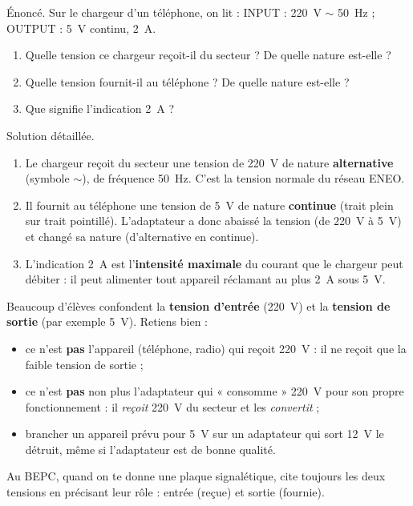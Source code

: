 \documentclass[11pt]{article}
\begin{document}
\begin{exoresolu}
Énoncé. Sur le chargeur d'un téléphone, on lit : INPUT : \SI{220}{V} $\sim$ \SI{50}{Hz} ; OUTPUT : \SI{5}{V} continu, \SI{2}{A}.
\begin{enumerate}
\item Quelle tension ce chargeur reçoit-il du secteur ? De quelle nature est-elle ?
\item Quelle tension fournit-il au téléphone ? De quelle nature est-elle ?
\item Que signifie l'indication \SI{2}{A} ?
\end{enumerate}
\tcblower
Solution détaillée.
\begin{enumerate}
\item Le chargeur reçoit du secteur une tension de \SI{220}{V} de nature \textbf{alternative} (symbole $\sim$), de fréquence \SI{50}{Hz}. C'est la tension normale du réseau ENEO.
\item Il fournit au téléphone une tension de \SI{5}{V} de nature \textbf{continue} (trait plein sur trait pointillé). L'adaptateur a donc abaissé la tension (de \SI{220}{V} à \SI{5}{V}) et changé sa nature (d'alternative en continue).
\item L'indication \SI{2}{A} est l'\textbf{intensité maximale} du courant que le chargeur peut débiter : il peut alimenter tout appareil réclamant au plus \SI{2}{A} sous \SI{5}{V}.
\end{enumerate}
\end{exoresolu}

\begin{attention}
Beaucoup d'élèves confondent la \textbf{tension d'entrée} (\SI{220}{V}) et la \textbf{tension de sortie} (par exemple \SI{5}{V}). Retiens bien :
\begin{itemize}
\item ce n'est \textbf{pas} l'appareil (téléphone, radio) qui reçoit \SI{220}{V} : il ne reçoit que la faible tension de sortie ;
\item ce n'est \textbf{pas} non plus l'adaptateur qui « consomme » \SI{220}{V} pour son propre fonctionnement : il \emph{reçoit} \SI{220}{V} du secteur et les \emph{convertit} ;
\item brancher un appareil prévu pour \SI{5}{V} sur un adaptateur qui sort \SI{12}{V} le détruit, même si l'adaptateur est de bonne qualité.
\end{itemize}
Au BEPC, quand on te donne une plaque signalétique, cite toujours les deux tensions en précisant leur rôle : entrée (reçue) et sortie (fournie).
\end{attention}
\end{document}
